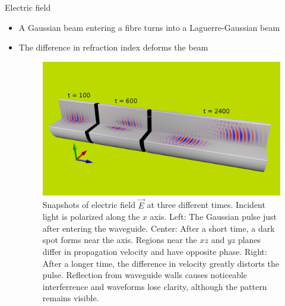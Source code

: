 \documentclass[8pt]{beamer}
\newlength{\wideitemsep}
\let\olditem\item
\renewcommand{\item}{\setlength{\itemsep}{\wideitemsep}\olditem}
\newcommand{\blockpadding}{
  \rule[-0.6ex]{0pt}{2.5ex}
}
\begin{document}
\begin{columns}[t]
 \begin{column}{0.596\textwidth}
  \begin{block}{\blockpadding Electric field}
  \begin{itemize}
   \item A Gaussian beam entering a fibre turns into a Laguerre-Gaussian beam
   \item The difference in refraction index deforms the beam
   \vspace{1ex}
\begin{figure}[h]
\centering
 \includegraphics[width=.825\textwidth,clip,trim=0mm 50mm 0mm 80mm]{./render_t}
 \caption{Snapshots of electric field $\vec E$ at three different times. Incident light is polarized along the $x$ axis. {\color{dark} Left:} The Gaussian pulse just after entering the waveguide. {\color{dark} Center:} After a short time, a dark spot forms near the axis. Regions near the $xz$ and $yz$ planes differ in propagation velocity and have opposite phase. {\color{dark} Right:} After a longer time, the difference in velocity greatly distorts the pulse. Reflection from waveguide walls causes noticeable interferrence and waveforms lose clarity, although the pattern remains visible. }
\end{figure}
\end{itemize}


\end{block}
\end{column}
\end{columns}
\end{document}
